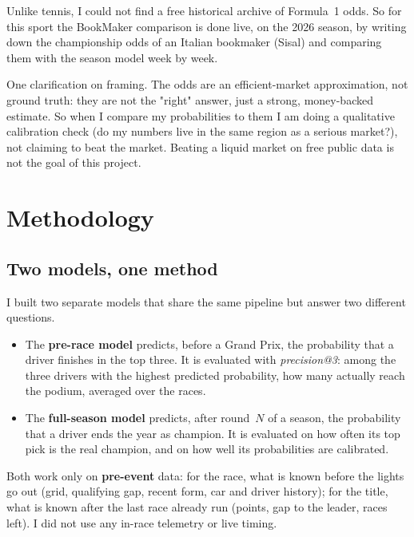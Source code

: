\documentclass[10pt,twocolumn]{article}
\begin{document}
Unlike tennis, I could not find a free historical archive of Formula~1 odds. So
for this sport the BookMaker comparison is done live, on the 2026 season, by
writing down the championship odds of an Italian bookmaker (Sisal) and comparing
them with the season model week by week.

One clarification on framing. The odds are an efficient-market approximation, not
ground truth: they are not the "right" answer, just a strong, money-backed
estimate. So when I compare my probabilities to them I am doing a qualitative
calibration check (do my numbers live in the same region as a serious market?),
not claiming to beat the market. Beating a liquid market on free public data is
not the goal of this project.

\section{Methodology}

\subsection{Two models, one method}
I built two separate models that share the same pipeline but answer two
different questions.

\begin{itemize}[leftmargin=1.2em,itemsep=2pt]
  \item The \textbf{pre-race model} predicts, before a Grand Prix, the
        probability that a driver finishes in the top three. It is evaluated
        with \emph{precision@3}: among the three drivers with the highest
        predicted probability, how many actually reach the podium, averaged
        over the races.
  \item The \textbf{full-season model} predicts, after round~\(N\) of a season,
        the probability that a driver ends the year as champion. It is
        evaluated on how often its top pick is the real champion, and on how
        well its probabilities are calibrated.
\end{itemize}

Both work only on \textbf{pre-event} data: for the race, what is known before
the lights go out (grid, qualifying gap, recent form, car and driver history);
for the title, what is known after the last race already run (points, gap to the
leader, races left). I did not use any in-race telemetry or live timing.
\end{document}
